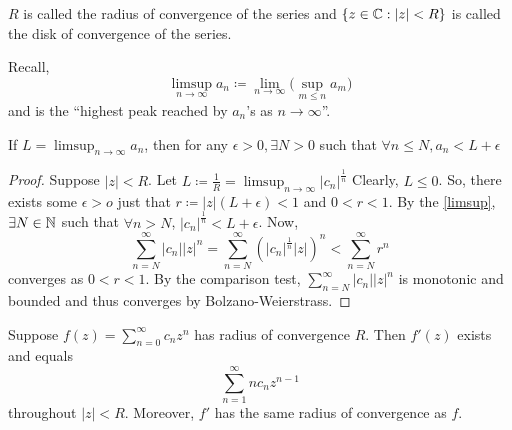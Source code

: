 \documentclass[11pt]{article}
\begin{document}
\begin{remark}
$R$ is called the radius of convergence of the series and $\{z \in \mathbb{C}:|z| < R\}$
is called the disk of convergence of the series.
\end{remark}
\begin{remark}
Recall, $$\limsup_{n\to\infty} a_n \coloneqq \lim_{n\to\infty}\bigg(
\sup_{m\leq n} a_m\bigg)$$
and is the ``highest peak reached by $a_n$'s as $n \to \infty$''.
\end{remark}
\begin{prop}
If $L = \limsup_{n\to\infty}a_n$, then for any $\epsilon > 0, \exists N > 0$
such that $\forall n \leq N, a_n < L + \epsilon$
\label{limsup}
\end{prop}
\begin{proof}
Suppose $|z| < R$. Let $\displaystyle L \coloneqq \frac{1}{R} = \limsup_{n \to
\infty} |c_n|^\frac{1}{n}$ Clearly, $L \leq 0$. So, there exists some $\epsilon
> o$ just that $r \coloneqq |z|(L + \epsilon) < 1$ and $0 < r < 1$. By the
\cref{limsup}, $\exists N \in \mathbb{N}$ such that $\forall n > N$,
$|c_n|^{\frac{1}{n}} < L+\epsilon$. Now,
\begin{equation*}
\sum^\infty_{n = N}|c_n||z|^n = \sum^\infty_{n=N}\left(|c_n|^{\frac{1}{n}}|z|
\right)^n < \sum^\infty_{n=N}r^n
\end{equation*}
converges as $0<r<1$. By the comparison test, $\sum^\infty_{n = N}|c_n||z|^n$ is
monotonic and bounded and thus converges by Bolzano-Weierstrass.
\end{proof}
\begin{theorem}
Suppose $\displaystyle f(z) = \sum^\infty_{n=0}c_nz^n$ has radius of
convergence $R$. Then $f'(z)$ exists and equals
\begin{equation*}
\sum^{\infty}_{n=1} nc_nz^{n-1}
\end{equation*}
throughout $|z| < R$. Moreover, $f'$ has the same radius of convergence as $f$.
\label{theorem4}
\end{theorem}
\end{document}
